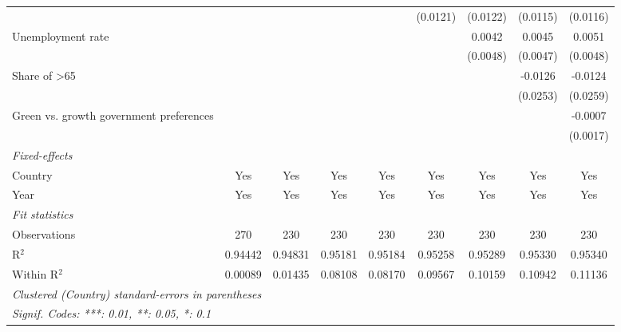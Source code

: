 \begin{table}[htbp]
\begin{tabular}{lcccccccc}
                                                            &          &          &                &                & (0.0121)       & (0.0122)       & (0.0115)       & (0.0116)\\   
      Unemployment rate                                     &          &          &                &                &                & 0.0042         & 0.0045         & 0.0051\\   
                                                            &          &          &                &                &                & (0.0048)       & (0.0047)       & (0.0048)\\   
      Share of >65                                          &          &          &                &                &                &                & -0.0126        & -0.0124\\   
                                                            &          &          &                &                &                &                & (0.0253)       & (0.0259)\\   
      Green vs. growth government preferences               &          &          &                &                &                &                &                & -0.0007\\   
                                                            &          &          &                &                &                &                &                & (0.0017)\\   
      \midrule
      \emph{Fixed-effects}\\
      Country                                               & Yes      & Yes      & Yes            & Yes            & Yes            & Yes            & Yes            & Yes\\  
      Year                                                  & Yes      & Yes      & Yes            & Yes            & Yes            & Yes            & Yes            & Yes\\  
      \midrule
      \emph{Fit statistics}\\
      Observations                                          & 270      & 230      & 230            & 230            & 230            & 230            & 230            & 230\\  
      R$^2$                                                 & 0.94442  & 0.94831  & 0.95181        & 0.95184        & 0.95258        & 0.95289        & 0.95330        & 0.95340\\  
      Within R$^2$                                          & 0.00089  & 0.01435  & 0.08108        & 0.08170        & 0.09567        & 0.10159        & 0.10942        & 0.11136\\  
      \midrule \midrule
      \multicolumn{9}{l}{\emph{Clustered (Country) standard-errors in parentheses}}\\
      \multicolumn{9}{l}{\emph{Signif. Codes: ***: 0.01, **: 0.05, *: 0.1}}\\
   \end{tabular}
\end{table}


